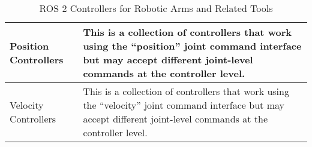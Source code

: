 \begin{table}[h!]
\begin{tabular}{|l|p{10cm}|}
    \hline
    Position Controllers & This is a collection of controllers that work using the “position” joint command interface but may accept different joint-level commands at the controller level. \\
    \hline
    Velocity Controllers &This is a collection of controllers that work using the “velocity” joint command interface but may accept different joint-level commands at the controller level. \\
    \hline
    \end{tabular}
    \caption{ROS 2 Controllers for Robotic Arms and Related Tools}
    \end{table}
    